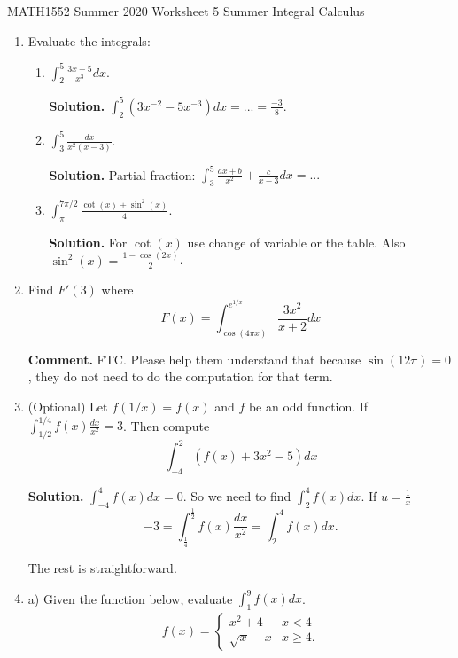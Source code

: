 \documentclass[12pt]{article}
\begin{document}
\noindent
MATH1552 Summer 2020
\hspace{2.2cm}
Worksheet 5 Summer
\hspace{2cm} Integral Calculus

\vspace{2mm}


\begin{enumerate}

\item Evaluate the integrals:

\begin{enumerate}
\item $\int_{2}^5 \frac{3x-5}{x^3}dx$.

\textbf{Solution. } $\int_2^5 (3x^{-2} - 5x^{-3}) dx = ... = \frac{-3}{8}.$

\item $\int_{3}^5 \frac{dx}{x^2(x-3)}$.

\textbf{Solution. } Partial fraction: $\int_3^5 \frac{ax+b}{x^2} + \frac{c}{x-3} dx = ...$

\item $\int_{\pi}^{7\pi/2} \frac{\cot(x)+\sin^2(x)}{4}$.

\textbf{Solution. } For $\cot(x)$ use change of variable or the table. Also $\sin^2(x) = \frac{1-\cos(2x)}{2}$. 

\end{enumerate}


\item Find $F'(3)$ where
$$F(x) = \int_{\cos(4\pi x)}^{e^{1/x}} \frac{3x^2}{x+2} dx$$

\textbf{Comment. } FTC. Please help them understand that because $\sin(12\pi)=0$, they do not need to do the computation for that term. 

\item (Optional) Let $f(1/x)=f(x)$ and  $f$ be an odd function. If $\int_{1/2}^{1/4} f(x)\frac{dx}{x^2} =3$. Then compute
$$\int_{-4}^2 (f(x)+3x^2 -5)dx$$

\textbf{Solution. } $\int_{-4}^4 f(x)dx =0$. So we need to find $\int_2^4 f(x)dx$. If $u=\frac{1}{x}$ 
$$-3 = \int_{\frac{1}{4}}^{\frac{1}{2}}f(x)\frac{dx}{x^2} = \int_{2}^{4}f(x)dx.$$

The rest is straightforward. 

\item a) Given the function below, evaluate $\int_{1}^9 f(x)dx$. 
\begin{align*}
f(x)=\begin{cases}
x^2+4 & x<4\\
\sqrt{x} -x & x\geq 4.
\end{cases}
\end{align*}


\end{enumerate}
\end{document}
